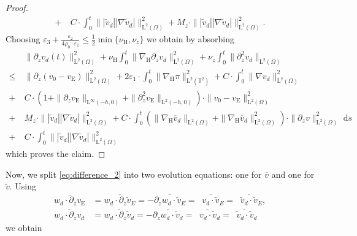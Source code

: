 \documentclass[preprint]{elsarticle}
\numberwithin{equation}{section}
\newcommand {\T}	{\mathbb{T}}
\renewcommand{\d}{\, \mathrm{d}}
\DeclareMathOperator{\divH}{div_{\H}}
\renewcommand{\H}{\mathrm{H}}
\newcommand{\dk}[1]{\partial_{#1}}
\newcommand{\dz}{\dk{z}}
\renewcommand{\bar}[1]{\overline{#1}}
\newcommand{\vbar}{\bar{v}}
\newcommand{\vtilde}{\tilde{v}}
\newcommand{\nablaH}{\nabla_{\H}}
\newcommand{\rL}{\mathrm{L}}
\newcommand{\rH}{\H}
\newcommand{\rE}{\mathrm{E}}
\newcommand{\btb}{\color{black}}
\newcommand{\etb}{\color{black}}
\begin{document}
\begin{proof}
\begin{equation*}
\begin{aligned}
			+ \ &C \cdot \int_0^t \| |\vtilde_d| |\nabla\vtilde_d| \|_{\rL^2(\Omega)}^2 + M_z \cdot \| |\vtilde_d| |\nabla\vtilde_d| \|_{\rL^2(\Omega)}^2.
		\end{aligned}
	\end{equation*}
	Choosing $\varepsilon_3 + \frac{\varepsilon_2}{4 \rho_0 \cdot \varepsilon_1} \leq \frac{1}{2} \min \{\nu_{\rH},\nu_z\}$ we obtain by absorbing 
	\begin{equation*}
		\begin{aligned}
			&\| \partial_z v_d(t) \|_{\rL^2(\Omega)}^2 
			+ \nu_{\rH} \int_0^t \| \nablaH \partial_z v_d \|_{\rL^2(\Omega)}^2
			+ \nu_z \int_0^t \| \partial_z^2 v_d \|_{\rL^2(\Omega)} \\ 
			\leq \ &\| \partial_z (v_0 - v_{\rE}) \|_{\rL^2(\Omega)}^2
			+ 2 \varepsilon_1 \cdot \int_0^t \| \nablaH \pi \|_{\rL^2(\T^2)}^2
			+ C \cdot \int_0^t \| \nabla v_d\|_{\rL^2(\Omega)}^2
			\\
			+ 
			\ &C \cdot (1 + \| \partial_z v_{\rE} \|_{\rL^\infty(-h,0)} + \| \partial_z^2 v_{\rE} \|_{\rL^2(-h,0)}) \cdot \| v_0 - v_{\rE} \|_{\rL^2(\Omega)}^2
			\\
			+ \ &M_z \cdot \| |\vtilde_d| |\nabla\vtilde_d| \|_{\rL^2(\Omega)}^2
			+ C \cdot \int_0^t (\| \nablaH \vbar_d \|_{\rL^2(\Omega)} + \| \nablaH \vbar_d \|_{\rL^2(\Omega)}^2) \cdot \| \partial_z v \|_{\rL^2(\Omega)}^2 \, \d s \\
			+ \ &C \cdot \int_0^t \| |\vtilde_d| |\nabla\vtilde_d| \|_{\rL^2(\Omega)}^2 
		\end{aligned}
	\end{equation*}
	which proves the claim.
\end{proof}
Now, we split \eqref{eq:difference_2} into two evolution equations: one for $\vbar$ and one for $\vtilde$. 
Using
\begin{align*}
	\overline{w_d \cdot  \dz v_{\rE}}
	&= \overline{w_d \cdot \dz \vtilde_E}
	= - \overline{\dz w_d \cdot \vtilde_E}
	= \overline{\divH v_d \cdot \vtilde_E}  
	= \overline{\divH \vtilde_d \cdot \vtilde_E}  , \\
	\overline{w_d \cdot  \dz v_d}
	&= \overline{w_d \cdot \dz \vtilde_d}
	= - \overline{\dz w_d \cdot \vtilde_d}
	= \overline{\divH v_d \cdot \vtilde_d}  
	= \overline{\divH \vtilde_d \cdot \vtilde_d}  
\end{align*}
we obtain
\end{document}
